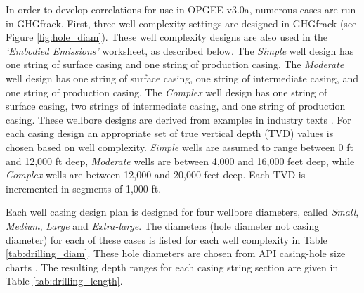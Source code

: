 \documentclass[11pt]{report}
\newcommand{\version}{v3.0a}
\newcommand{\sheet}[1]{\textit{`{#1}'}}
\begin{document}
In order to develop correlations for use in OPGEE \version, numerous cases are run in GHGfrack.  First, three well complexity settings are designed in GHGfrack (see Figure \ref{fig:hole_diam}).  These well complexity designs are also used in the \sheet{Embodied Emissions} worksheet, as described below. The \emph{Simple} well design has one string of surface casing and one string of production casing.  The \emph{Moderate} well design has one string of surface casing, one string of intermediate casing, and one string of production casing.  The \emph{Complex} well design has one string of surface casing, two strings of intermediate casing, and one string of production casing.  These wellbore designs are derived from examples in industry texts \cite{Mitchell2006}. For each casing design an appropriate set of true vertical depth (TVD) values is chosen based on well complexity. \emph{Simple} wells are assumed to range between 0 ft and 12,000 ft deep, \emph{Moderate} wells are between 4,000 and 16,000 feet deep, while \emph{Complex} wells are between 12,000 and 20,000 feet deep.  Each TVD is incremented in segments of 1,000 ft.  

Each well casing design plan is designed for four wellbore diameters, called \emph{Small}, \emph{Medium}, \emph{Large} and \emph{Extra-large}.  The diameters (hole diameter not casing diameter) for each of these cases is listed for each well complexity in Table \ref{tab:drilling_diam}.  These hole diameters are chosen from API casing-hole size charts \cite[Figure 11.22]{Mitchell2006}.   The resulting depth ranges for each casing string section are given in Table \ref{tab:drilling_length}.  
\end{document}

